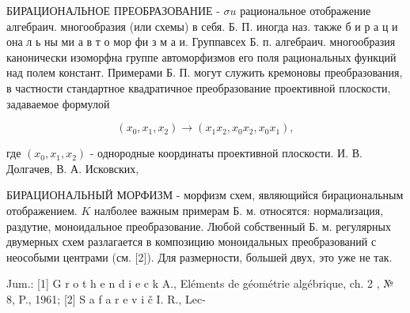 \documentclass[10pt]{article}
\begin{document}
БИРАЦИОНАЛЬНОЕ ПРЕОБРАЗОВАНИЕ - $\sigma u$ рациональное отображение алгебраич. многообразия (или схемы) в себя. Б. П. иногда наз. также б и р а ц и она л ь ны ми а в т о мор фи з м а и. Группавсех Б. п. алгебраич. многообразия канонически изоморфна группе автоморфизмов его поля рациональных функций над полем констант. Примерами Б. П. могут служить кремоновы преобразования, в частности стандартное квадратичное преобразование проективной плоскости, задаваемое формулой



\[

\left(x_{0}, x_{1}, x_{2}\right) \rightarrow\left(x_{1} x_{2}, x_{0} x_{2}, x_{0} x_{1}\right),

\]



где $\left(x_{0}, x_{1}, x_{2}\right)$ - однородные координаты проективной плоскости. И. В. Долгачев, В. А. Исковских,



БИРАЦИОНАЛЬНЫЙ МОРФИЗМ - морфизм схем, являющийся бирациональным отображением. $K$ налболее важным примерам Б. м. относятся: нормализация, раздутие, моноидальное преобразование. Любой собственный Б. м. регулярных двумерных схем разлагается в композицию моноидальных преобразований с неособыми центрами (см. [2]). Для размерности, большей двух, это уже не так.



Jum.: [1] G r o t h e n d i e c k A., Eléments de géométrie algébrique, ch. 2 , № 8, P., 1961; [2] S a f a r e v i č I. R., Lec-
\end{document}
